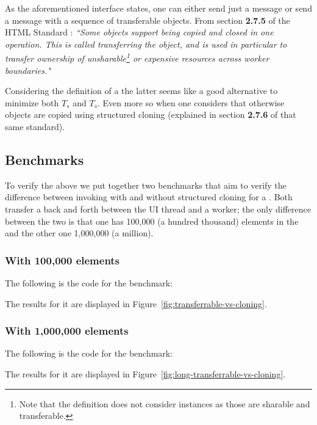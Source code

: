 As the aforementioned interface states, one can either send just a message or send a message with a sequence of transferable objects. From section \textbf{2.7.5} of the HTML Standard \cite{html-whatwg}:
\textit{``Some objects support being copied and closed in one operation. This is called transferring the object, and is used in particular to transfer ownership of unsharable\footnote{Note that the definition does not consider \tsabuffer{} instances as those are sharable and transferable.} or expensive resources across worker boundaries."}

Considering the definition of a  the latter seems like a good alternative to minimize both \(T_{s}\) and \(T_{s}\). Even more so when one considers that otherwise objects are copied using structured cloning (explained in section \textbf{2.7.6} of that same standard).

\subsection{Benchmarks}
To verify the above we put together two benchmarks that aim to verify the difference between invoking  with and without structured cloning for a \ttarray{}. Both transfer a \ttarray{} back and forth between the UI thread and a worker; the only difference between the two is that one has 100,000 (a hundred thousand) elements in the \ttarray{} and the other one 1,000,000 (a million).

\subsubsection{With 100,000 elements}
The following is the code for the benchmark:

The results for it are displayed in Figure~\ref{fig:transferrable-vs-cloning}.

\subsubsection{With 1,000,000 elements}
The following is the code for the benchmark:

The results for it are displayed in Figure~\ref{fig:long-transferrable-vs-cloning}.

